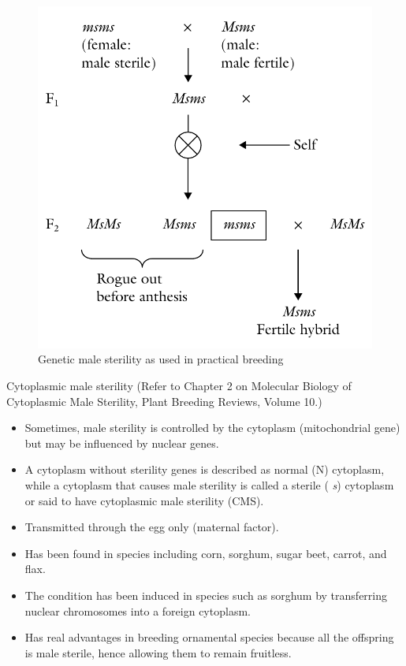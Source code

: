 \documentclass[11pt,ignorenonframetext,aspectratio=169]{beamer}
\providecommand{\tightlist}{%
  \setlength{\itemsep}{0pt}\setlength{\parskip}{0pt}}
\begin{document}
\begin{frame}{}
\protect\hypertarget{section-15}{}
\begin{figure}

{\centering \includegraphics[width=0.5\linewidth]{./images/gms_use} 

}

\caption{Genetic male sterility as used in practical breeding}\label{fig:gms-use}
\end{figure}
\end{frame}

\begin{frame}{Cytoplasmic male sterility}
\protect\hypertarget{cytoplasmic-male-sterility}{}
(Refer to Chapter 2 on Molecular Biology of Cytoplasmic Male Sterility,
Plant Breeding Reviews, Volume 10.)

\footnotesize

\begin{itemize}
\tightlist
\item
  Sometimes, male sterility is controlled by the cytoplasm
  (mitochondrial gene) but may be influenced by nuclear genes.
\item
  A cytoplasm without sterility genes is described as normal (N)
  cytoplasm, while a cytoplasm that causes male sterility is called a
  sterile ( \emph{s}) cytoplasm or said to have cytoplasmic male
  sterility (CMS).
\item
  Transmitted through the egg only (maternal factor).
\item
  Has been found in species including corn, sorghum, sugar beet, carrot,
  and flax.
\item
  The condition has been induced in species such as sorghum by
  transferring nuclear chromosomes into a foreign cytoplasm.
\item
  Has real advantages in breeding ornamental species because all the
  offspring is male sterile, hence allowing them to remain fruitless.
\end{itemize}
\end{frame}
\end{document}
